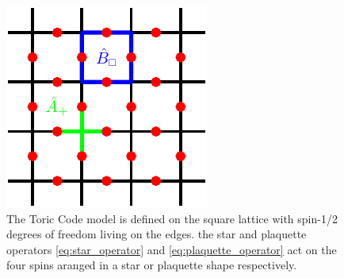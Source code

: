 \begin{figure}
	\centering
	\includegraphics[scale=1]{figures/tikz/toric_code/toric_code_general/toric_code_general.pdf}
	\caption{The Toric Code model is defined on the square lattice with spin-1/2 degrees of freedom living on the edges. the star and plaquette operators \eqref{eq:star_operator} and \eqref{eq:plaquette_operator} act on the four spins aranged in a star or plaquette shape respectively.}
	\label{fig:toric_code_star_and_plaquette_operators}
\end{figure}
